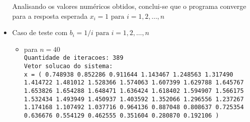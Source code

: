 \begin{itemize}
	Analisando os valores numéricos obtidos, conclui-se que o programa converge para a resposta esperada $x_{i} = 1 \text{ para } i = 1, 2, \dots, n$

	\item Caso de teste com $b_{i} = 1/i \text{ para } i = 1, 2, \dots, n$
	
	\begin{itemize}
		\item para $n = 40$\\
		\texttt{Quantidade de iteracoes: 389\\
			Vetor solucao do sistema:\\
			x = (  0.748938  0.852286  0.911644  1.143467  1.248563  1.317490  1.414722  1.481012  1.528366  1.574063  1.607399  1.629788  1.645767  1.653826  1.654288  1.648471  1.636424  1.618402  1.594907  1.566175  1.532434  1.493949  1.450937  1.403592  1.352066  1.296556  1.237267  1.174168  1.107492  1.037716  0.964136  0.887048  0.808637  0.725354  0.636676  0.554129  0.462555  0.351604  0.280870  0.192106  )}
	\end{itemize}
\end{itemize}

